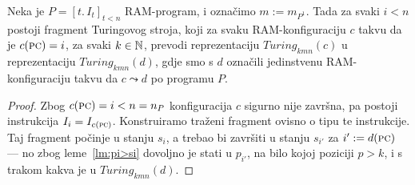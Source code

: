 \begin{propozicija}[{name=[{treći fragment transpiliranog stroja, izvršavanje instrukcija}]}]\label{prop:gadgets}
    Neka je $P=[t.\,I_t]_{t<n}$ RAM-program, i označimo $m:=m_{P^1}$. Tada za svaki $i<n$ postoji fragment Turingovog stroja, koji za svaku RAM-konfiguraciju $c$ takvu da je $c(\textsc{pc})=i$, za svaki $k\in{\mathbb N}$, prevodi reprezentaciju $Turing_{kmn}(c)$ u reprezentaciju $Turing_{kmn}(d)$, gdje smo s $d$ označili jedinstvenu RAM-konfiguraciju takvu da $c\leadsto d$ po programu $P$.
\end{propozicija}
\begin{proof}
Zbog $c(\textsc{pc})=i<n=n_P$ konfiguracija $c$ sigurno nije završna, pa postoji instrukcija $I_i=I_{c(\textsc{pc})}$. Konstruiramo traženi fragment ovisno o tipu te instrukcije. Taj fragment počinje u stanju $s_i$, a trebao bi završiti u stanju $s_{i'}$ za $i':=d(\textsc{pc})$ --- no zbog leme~\ref{lm:pi>si} dovoljno je stati u $p_{i'}$, na bilo kojoj poziciji $p>k$, i s trakom kakva je u $Turing_{kmn}(d)$.


\end{proof}
